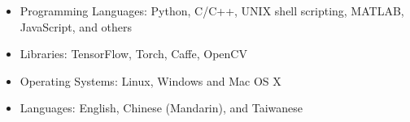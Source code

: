 \documentclass[10pt]{article}
\renewcommand{\section}[1]{\pagebreak[3]%
    \hyphenpenalty=10000%
    \vspace{1.3\baselineskip}%
    \phantomsection\addcontentsline{toc}{section}{#1}%
    \noindent\llap{\scshape\smash{\parbox[t]{\marginparwidth}{\raggedright #1}}}%
    \vspace{-\baselineskip}\par}
\newenvironment{innerlist}[1][\enskip\textbullet]%
        {\begin{itemize}[#1,leftmargin=*,parsep=0pt,itemsep=0pt,topsep=0pt,partopsep=0pt]}
        {\end{itemize}}
\begin{document}
\begin{itemize}[leftmargin=0pt,parsep=3pt,itemsep=0pt,topsep=0pt,partopsep=0pt]
\item[] Programming Languages: Python, C/C++, UNIX shell scripting, MATLAB, JavaScript, and others
\item[] Libraries: TensorFlow, Torch, Caffe, OpenCV
\item[] Operating Systems: Linux, Windows and Mac OS X
\item[] Languages: English, Chinese (Mandarin), and Taiwanese
\end{itemize}

% 
% 
% 

\end{document}
